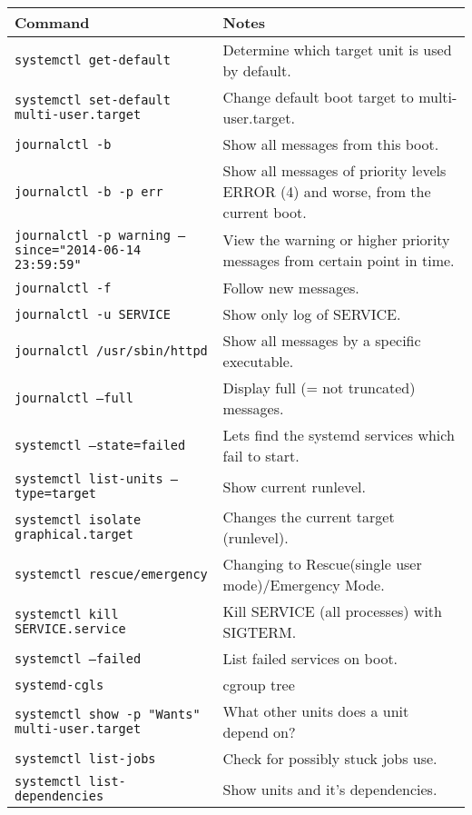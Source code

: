 \documentclass[a4paper]{article}
\begin{document}
\begin{center}
\vspace{6mm}

\begin{tabularx}{\textwidth}{ |l|X| }
\hline
\rowcolor[gray]{.8}
\bfseries Command                                       & \bfseries Notes \\\hline
\tt systemctl get-default                               & Determine which target unit is used by default. \\\hline
\tt systemctl set-default multi-user.target             & Change default boot target to multi-user.target. \\\hline
\tt journalctl -b                                       & Show all messages from this boot. \\\hline
\tt journalctl -b -p err                                & Show all messages of priority levels ERROR (4) and worse, from the current boot. \\\hline
\tt journalctl -p warning --since="2014-06-14 23:59:59" &  View the warning or higher priority messages from certain point in time. \\\hline
\tt journalctl -f                                       & Follow new messages. \\\hline
\tt journalctl -u SERVICE                               & Show only log of SERVICE. \\\hline
\tt journalctl /usr/sbin/httpd                          & Show all messages by a specific executable. \\\hline
\tt journalctl --full                                   & Display full (= not truncated) messages. \\\hline
\tt systemctl --state=failed                            & Lets find the systemd services which fail to start. \\\hline
\tt systemctl list-units --type=target                  & Show current runlevel. \\\hline
\tt systemctl isolate graphical.target                  & Changes the current target (runlevel). \\\hline
\tt systemctl rescue/emergency                          & Changing to Rescue(single user mode)/Emergency Mode. \\\hline
\tt systemctl kill SERVICE.service                      & Kill SERVICE (all processes) with SIGTERM. \\\hline
\tt systemctl --failed                                  & List failed services on boot. \\\hline
\tt systemd-cgls                                        & cgroup tree \\\hline
\tt systemctl show -p "Wants" multi-user.target         & What other units does a unit depend on? \\\hline
\tt systemctl list-jobs                                 & Check for possibly stuck jobs use. \\\hline
\tt systemctl list-dependencies                         & Show units and it's dependencies. \\\hline
\end{tabularx}


\end{center}
\end{document}
